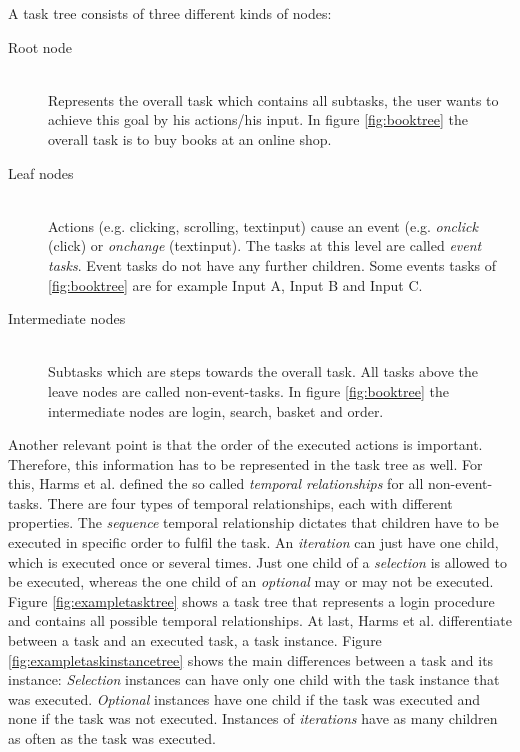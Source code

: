 A task tree consists of three different kinds of nodes:
\begin{description}
	\item[Root node]\hfill\\ Represents the overall task which contains all subtasks, the user wants to achieve this goal by his actions/his input. In figure \ref{fig:booktree} the overall task is to buy books at an online shop.
	\item[Leaf nodes]\hfill\\ Actions (e.g. clicking, scrolling, textinput) cause an event (e.g. \textit{onclick} (click) or \textit{onchange} (textinput). The tasks at this level are called \textit{event tasks}. Event tasks do not have any further children. Some events tasks of \ref{fig:booktree} are for example Input A, Input B and Input C.
	\item[Intermediate nodes]\hfill\\ Subtasks which are steps towards the overall task. All tasks above the leave nodes are called non-event-tasks. In figure \ref{fig:booktree} the intermediate nodes are login, search, basket and order.
\end{description}
Another relevant point is that the order of the executed actions is important.
Therefore, this information has to be represented in the task tree as well.
For this, Harms et al. defined the so called \textit{temporal relationships} for all non-event-tasks.
There are four types of temporal relationships, each with different properties.
The \textit{sequence} temporal relationship dictates that children have to be executed in specific order to fulfil the task.
An \textit{iteration} can just have one child, which is executed once or several times.
Just one child of a \textit{selection} is allowed to be executed, whereas the one child of an \textit{optional} may or may not be executed.
Figure \ref{fig:exampletasktree} shows a task tree that represents a login procedure and contains all possible temporal relationships.
At last, Harms et al. differentiate between a task and an executed task, a task instance.
Figure \ref{fig:exampletaskinstancetree} shows the main differences between a task and its instance: \textit{Selection} instances can have only one child with the task instance that was executed. \textit{Optional} instances have one child if the task was executed and none if the task was not executed. Instances of \textit{iterations} have as many children as often as the task was executed.
